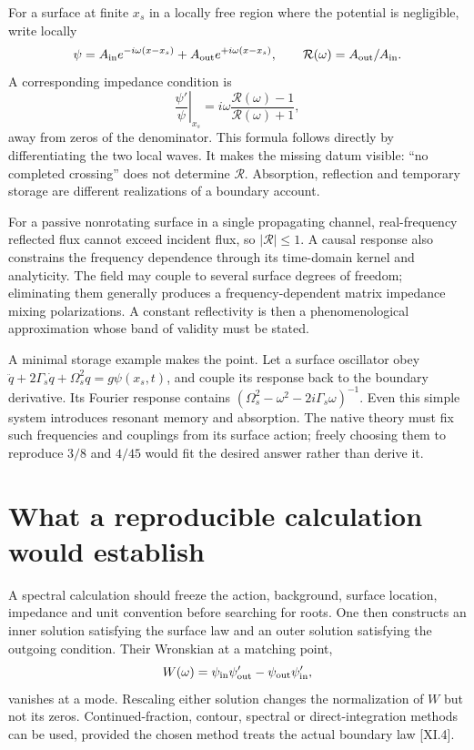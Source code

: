 For a surface at finite $x_s$ in a locally free region where the potential is negligible, write locally
\begin{equation}
 \psi=A_{\rm in}e^{-i\omega(x-x_s)}
       +A_{\rm out}e^{+i\omega(x-x_s)},\qquad
 \mathcal R(\omega)=A_{\rm out}/A_{\rm in}.
 \label{c11:reflectivity}
\end{equation}
A corresponding impedance condition is
\begin{equation}
 \left.\frac{\psi'}{\psi}\right|_{x_s}
 =i\omega\frac{\mathcal R(\omega)-1}{\mathcal R(\omega)+1},
 \label{c11:impedance}
\end{equation}
away from zeros of the denominator. This formula follows directly by differentiating the two local waves. It makes the missing datum visible: ``no completed crossing'' does not determine $\mathcal R$. Absorption, reflection and temporary storage are different realizations of a boundary account.

For a passive nonrotating surface in a single propagating channel, real-frequency reflected flux cannot exceed incident flux, so $|\mathcal R|\leq1$. A causal response also constrains the frequency dependence through its time-domain kernel and analyticity. The field may couple to several surface degrees of freedom; eliminating them generally produces a frequency-dependent matrix impedance mixing polarizations. A constant reflectivity is then a phenomenological approximation whose band of validity must be stated.

A minimal storage example makes the point. Let a surface oscillator obey $\ddot q+2\Gamma_s\dot q+\Omega_s^2q=g\psi(x_s,t)$, and couple its response back to the boundary derivative. Its Fourier response contains $(\Omega_s^2-\omega^2-2i\Gamma_s\omega)^{-1}$. Even this simple system introduces resonant memory and absorption. The native theory must fix such frequencies and couplings from its surface action; freely choosing them to reproduce $3/8$ and $4/45$ would fit the desired answer rather than derive it.

\section{What a reproducible calculation would establish}
A spectral calculation should freeze the action, background, surface location, impedance and unit convention before searching for roots. One then constructs an inner solution satisfying the surface law and an outer solution satisfying the outgoing condition. Their Wronskian at a matching point,
\begin{equation}
 W(\omega)=\psi_{\rm in}\psi_{\rm out}'
              -\psi_{\rm out}\psi_{\rm in}',
 \label{c11:wronskian}
\end{equation}
vanishes at a mode. Rescaling either solution changes the normalization of $W$ but not its zeros. Continued-fraction, contour, spectral or direct-integration methods can be used, provided the chosen method treats the actual boundary law [XI.4].


